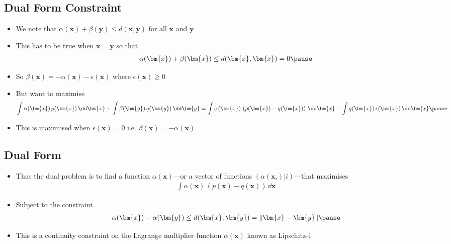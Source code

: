 \begin{slide}
\section{Dual Form Constraint}

\begin{PauseHighLight}
  \begin{itemize}
  \item We note that $\alpha(\bm{x}) + \beta(\bm{y}) \leq d(\bm{x},\bm{y})$ for
    all $\bm{x}$ and $\bm{y}$\pause
  \item This has to be true when $\bm{x}=\bm{y}$ so that
    \begin{align*}
      \alpha(\bm{x}) + \beta(\bm{x}) \leq d(\bm{x},\bm{x}) = 0\pause
    \end{align*}
  \item So $\beta(\bm{x}) = -\alpha(\bm{x}) - \epsilon(\bm{x})$ where
    $\epsilon(\bm{x})\geq0$\pause
  \item But want to maximise {\small
    \begin{align*}
      \int \alpha(\bm{x})\,p(\bm{x})\, \dd \bm{x} + \int
      \beta(\bm{y})\,q(\bm{y})\,\dd \bm{y}
      = \int \alpha(\bm{x})\,\left(p(\bm{x}) - q(\bm{x})\right) \, \dd
      \bm{x} - \int q(\bm{x}) \, \epsilon(\bm{x}) \,\dd\bm{x} \pause
    \end{align*}}
  \item This is maximised when $\epsilon(\bm{x})=0$\pause{}
    i.e. $\beta(\bm{x}) = - \alpha(\bm{x})$\pauseb
  \end{itemize}
\end{PauseHighLight}

\end{slide}


\begin{slide}
\section{Dual Form}

\begin{PauseHighLight}
  \begin{itemize}
  \item Thus the dual problem is to find a function $\alpha(\bm{x})$---or a
    vector of functions $(\alpha(\bm{x}_i)|i)$---that maximises
    \begin{align*}
      \int \alpha(\bm{x})\,\left(p(\bm{x}) - q(\bm{x})\right) \, \dd \bm{x}
    \end{align*}
  \item Subject to the constraint
    \begin{align*}
      \alpha(\bm{x}) - \alpha(\bm{y}) \leq d(\bm{x},\bm{y}) = \| \bm{x}-\bm{y} \|\pause
    \end{align*}
  \item This is a continuity constraint on the Lagrange multiplier
    function $\alpha(\bm{x})$ known as Lipschitz-1\pause
  \end{itemize}
\end{PauseHighLight}

\end{slide}

